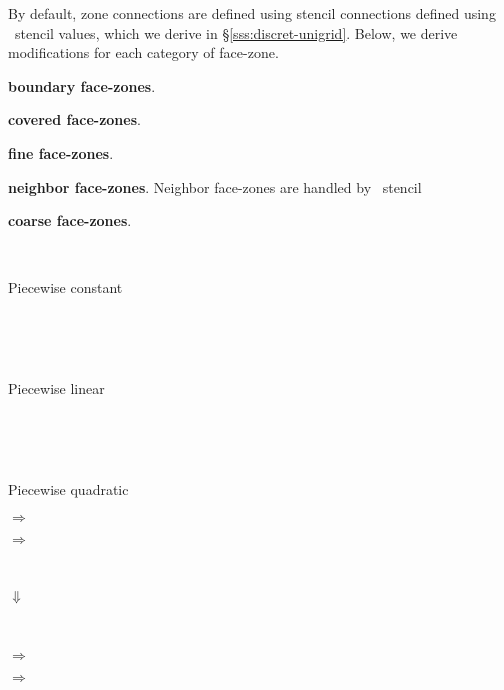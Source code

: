 \documentclass[10pt]{article}
\begin{document}
By default, zone connections are defined using stencil connections defined
using \hypre\ stencil values, which we derive in \S\ref{sss:discret-unigrid}.
Below, we derive modifications for each category of face-zone.

\textbf{boundary face-zones}.

\textbf{covered face-zones}.


\textbf{fine face-zones}.

\textbf{neighbor face-zones}.  Neighbor face-zones are handled by \hypre\ stencil


\textbf{coarse face-zones}.



\begin{center}
\begin{minipage}{1.25in}
 \\
\centerline{Piecewise constant}
\end{minipage} \ \ \ 
\begin{minipage}{1.25in}
 \\
\centerline{Piecewise linear}
\end{minipage} \ \ \ 
\begin{minipage}{1.25in}
 \\
\centerline{Piecewise quadratic}
\end{minipage}
\end{center}



\begin{center}
\begin{minipage}{2in}
\end{minipage}$\Rightarrow$
\begin{minipage}{2in}
\end{minipage}$\Rightarrow$
\begin{minipage}{2in}
\end{minipage} \\
\begin{minipage}{4.5in}
\hfill $\Downarrow$
\end{minipage} \\
\begin{minipage}{2in}
\end{minipage}$\Rightarrow$
\begin{minipage}{2in}
\end{minipage}$\Rightarrow$
\begin{minipage}{2in}
\end{minipage}
\end{center}
\end{document}
